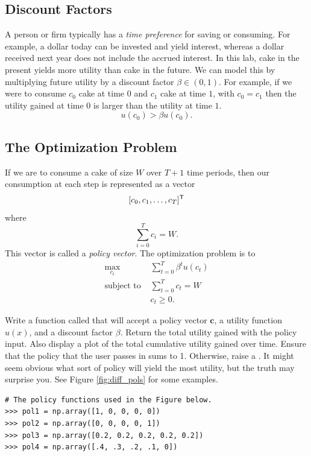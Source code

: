 \subsection*{Discount Factors}

A person or firm typically has a \emph{time preference} for saving or consuming.
For example, a dollar today can be invested and yield interest, whereas a dollar received next year does not include the accrued interest.
In this lab, cake in the present yields more utility than cake in the future.
We can model this by multiplying future utility by a discount factor $\beta \in (0,1)$.
For example, if we were to consume $c_0$ cake at time $0$ and $c_1$ cake at time $1$, with $c_0 = c_1$ then the utility gained at time $0$ is larger than the utility at time $1$.
\[
u(c_0) > \beta u(c_0).
\]

\subsection*{The Optimization Problem}

If we are to consume a cake of size $W$ over $T+1$ time periods, then our consumption at each step is represented as a vector
\[
[c_0, c_1, \ldots , c_T]^{\mathsf T}
\]
where
\[
\sum_{i=0}^T c_i = W.
\]
This vector is called a \emph{policy vector}.  The optimization problem is to
\begin{align*}
\max_{c_t}  & \sum_{t=0}^T \beta^t u(c_t) \\
\mbox{subject to } & \sum_{t=0}^T c_t = W \\
& c_t \geq 0.
\end{align*}

\begin{problem}

Write a function called  that will accept a policy vector $\mathbf{c}$, a utility function $u(x)$, and a discount factor $\beta$.
Return the total utility gained with the policy input.
Also display a plot of the total cumulative utility gained over time.
Ensure that the policy that the user passes in sums to 1.
Otherwise, raise a .
It might seem obvious what sort of policy will yield the most utility, but the truth may surprise you.
See Figure \ref{fig:diff_pols} for some examples.

\begin{lstlisting}
# The policy functions used in the Figure below.
>>> pol1 = np.array([1, 0, 0, 0, 0])
>>> pol2 = np.array([0, 0, 0, 0, 1])
>>> pol3 = np.array([0.2, 0.2, 0.2, 0.2, 0.2])
>>> pol4 = np.array([.4, .3, .2, .1, 0])
\end{lstlisting}

\end{problem}

